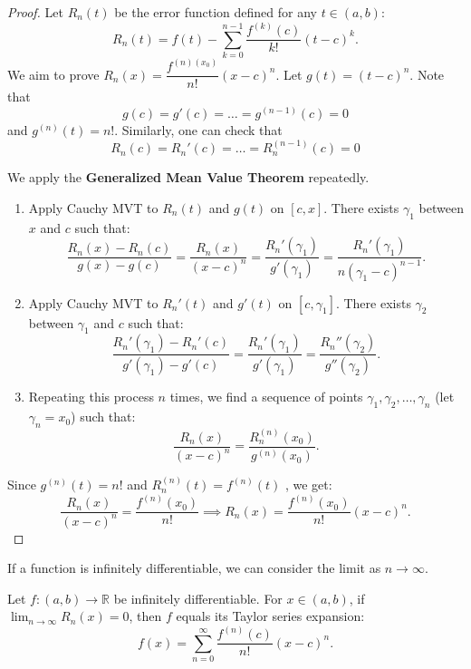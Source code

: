 \documentclass[
	UTF-8,
	11pt, %
	a4paper, %
]{LegrandOrangeBook}
\begin{document}
    \begin{proof}
    Let $R_n(t)$ be the error function defined for any $t \in (a, b)$:
    \[ R_n(t) = f(t) - \sum_{k=0}^{n-1} \frac{f^{(k)}(c)}{k!} (t - c)^k. \]
    We aim to prove $R_n(x) = \dfrac{f^{(n)(x_0)}}{n!}(x-c)^n$.
    Let $g(t) = (t - c)^n$. 
    Note that $$g(c) = g'(c) =  \dots = g^{(n-1)}(c) = 0$$
    and $g^{(n)}(t) = n!$.
    Similarly, one can check that $$R_n(c) = R_n'(c) = \dots = R_n^{(n-1)}(c) = 0$$

    We apply the \textbf{Generalized Mean Value Theorem} repeatedly.
    \begin{enumerate}
        \item Apply Cauchy MVT to $R_n(t)$ and $g(t)$ on $[c, x]$. 
        There exists $\gamma_1$ between $x$ and $c$ such that:
        \[ \frac{R_n(x) - R_n(c)}{g(x) - g(c)} = \frac{R_n(x)}{(x-c)^n} = \frac{R_n'(\gamma_1)}{g'(\gamma_1)} = \frac{R_n'(\gamma_1)}{n(\gamma_1 - c)^{n-1}}. \]
        
        \item Apply Cauchy MVT to $R_n'(t)$ and $g'(t)$ on $[c, \gamma_1]$. There exists $\gamma_2$ between $\gamma_1$ and $c$ such that:
        \[ \frac{R_n'(\gamma_1) - R_n'(c)}{g'(\gamma_1) - g'(c)} = \frac{R_n'(\gamma_1)}{g'(\gamma_1)} = \frac{R_n''(\gamma_2)}{g''(\gamma_2)}. \]
        
        \item Repeating this process $n$ times, we find a sequence of points $\gamma_1, \gamma_2, \dots, \gamma_n$ (let $\gamma_n = x_0$) such that:
        \[ \frac{R_n(x)}{(x-c)^n} = \frac{R_n^{(n)}(x_0)}{g^{(n)}(x_0)}. \]
    \end{enumerate}
    Since $g^{(n)}(t) = n!$ and $R_n^{(n)}(t) = f^{(n)}(t)$ , we get:
    \[ \frac{R_n(x)}{(x-c)^n} = \frac{f^{(n)}(x_0)}{n!} \implies R_n(x) = \frac{f^{(n)}(x_0)}{n!} (x - c)^n. \]
    \end{proof}

    \newpage

    If a function is infinitely differentiable, we can consider the limit as $n \to \infty$.

    \begin{corollary}
    Let $f: (a, b) \to \mathbb{R}$ be infinitely differentiable. For $x \in (a, b)$, if $\lim_{n \to \infty} R_n(x) = 0$, then $f$ equals its Taylor series expansion:
    \[ f(x) = \sum_{n=0}^{\infty} \frac{f^{(n)}(c)}{n!} (x - c)^n. \]
    \end{corollary}
\end{document}
